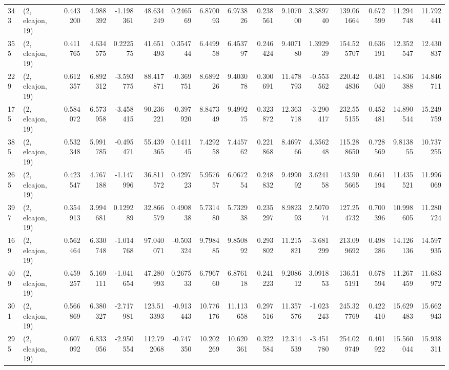 \begin{tabular}{llrrrrrrrrrrrrrr}
343 &  (2, elcajon, 19) &   0.443200 &   4.988392 &  -1.198361 &    48.634249 &   0.246569 &   6.870093 &   6.973826 &  0.238561 &   9.107000 &   3.389740 &   139.061664 &   0.672599 &  11.294748 &  11.792441 \\
355 &  (2, elcajon, 19) &   0.411765 &   4.634575 &   0.222575 &    41.651493 &   0.354744 &   6.449958 &   6.453797 &  0.246424 &   9.407180 &   1.392939 &   154.525707 &   0.636191 &  12.352547 &  12.430837 \\
229 &  (2, elcajon, 19) &   0.612357 &   6.892312 &  -3.593775 &    88.417871 &  -0.369751 &   8.689226 &   9.403078 &  0.300691 &  11.478793 &  -0.553562 &   220.424836 &   0.481040 &  14.836388 &  14.846711 \\
175 &  (2, elcajon, 19) &   0.584072 &   6.573958 &  -3.458415 &    90.236221 &  -0.397920 &   8.847349 &   9.499275 &  0.323872 &  12.363718 &  -3.290417 &   232.555155 &   0.452481 &  14.890544 &  15.249759 \\
385 &  (2, elcajon, 19) &   0.532348 &   5.991785 &  -0.495471 &    55.439365 &   0.141145 &   7.429258 &   7.445762 &  0.221868 &   8.469766 &   4.356248 &   115.288650 &   0.728569 &   9.813855 &  10.737255 \\
265 &  (2, elcajon, 19) &   0.423547 &   4.767188 &  -1.147996 &    36.811572 &   0.429723 &   5.957657 &   6.067254 &  0.248832 &   9.499092 &   3.624158 &   143.905665 &   0.661194 &  11.435521 &  11.996069 \\
397 &  (2, elcajon, 19) &   0.354913 &   3.994681 &   0.129289 &    32.866579 &   0.490838 &   5.731480 &   5.732938 &  0.235297 &   8.982393 &   2.507074 &   127.254732 &   0.700396 &  10.998605 &  11.280724 \\
169 &  (2, elcajon, 19) &   0.562464 &   6.330748 &  -1.014768 &    97.040071 &  -0.503324 &   9.798485 &   9.850892 &  0.293802 &  11.215821 &  -3.681299 &   213.099692 &   0.498286 &  14.126136 &  14.597935 \\
409 &  (2, elcajon, 19) &   0.459257 &   5.169111 &  -1.041654 &    47.280993 &   0.267533 &   6.796760 &   6.876118 &  0.241223 &   9.208612 &   3.091853 &   136.515191 &   0.678594 &  11.267459 &  11.683972 \\
301 &  (2, elcajon, 19) &   0.566869 &   6.380327 &  -2.717981 &   123.513393 &  -0.913443 &  10.776176 &  11.113658 &  0.297516 &  11.357576 &  -1.023243 &   245.327769 &   0.422410 &  15.629483 &  15.662943 \\
295 &  (2, elcajon, 19) &   0.607092 &   6.833056 &  -2.950554 &   112.792068 &  -0.747350 &  10.202269 &  10.620361 &  0.322584 &  12.314539 &  -3.451780 &   254.029749 &   0.401922 &  15.560044 &  15.938311 \\

\end{tabular}
